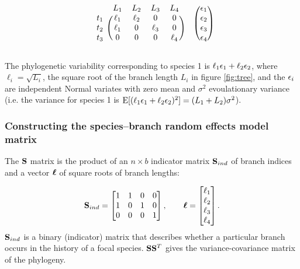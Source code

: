 \documentclass[12pt]{article}
\begin{document}
\[
  \begin{blockarray}{ccccc}
  & L_1 & L_2 & L_3 & L_4  \\
  \begin{block}{c(cccc)}
  t_1 & \ell_1 & \ell_2 & 0           & 0 \\
  t_2 & \ell_1 &  0          & \ell_3 & 0 \\
  t_3 & 0           &  0          & 0           & \ell_4 \\
  \end{block}
  \end{blockarray}
  \hspace{0.5cm}
  \begin{blockarray}{(c)}
  \e_1 \\
  \e_2 \\
  \e_3 \\
  \e_4 \\
  \end{blockarray}
  \]


The phylogenetic variability corresponding to species 1 is $\ell_1 { \epsilon}_1 + \ell_2 { \epsilon}_2$, where $\ell_i = \sqrt{L_i}$, the square root of the branch length $L_i$ in figure \ref{fig:tree}, and the ${ \epsilon}_i$ are independent Normal variates with zero mean and $\sigma^2$ evoulationary variance (i.e. the variance for species 1 is $\textrm{E}[(\ell_1 { \epsilon}_1 + \ell_2 { \epsilon}_2)^2] = (L_1 + L_2)\sigma^2$).

\subsubsection*{Constructing the species--branch random effects model matrix}

The ${\mathbf S}$ matrix is the product of an $n \times b$ indicator matrix ${\mathbf S}_{ind}$ of branch indices and a vector ${\boldsymbol \ell}$ of square roots of branch lengths:

\[
{\mathbf S}_{ind} = \begin{bmatrix}
1 & 1 & 0 & 0 \\ 
1 & 0 & 1 & 0 \\ 
0 & 0 & 0 & 1
\end{bmatrix} , 
\qquad
{\boldsymbol \ell} = \begin{bmatrix}
\ell_1 \\
\ell_2 \\
\ell_3 \\
\ell_4 
\end{bmatrix} .
\]
${\mathbf S}_{ind}$ is a binary (indicator) matrix that describes whether a particular branch occurs in the history of a focal species. 
${\mathbf S} {\mathbf S}^T$ gives the variance-covariance matrix of the phylogeny. 
\end{document}
